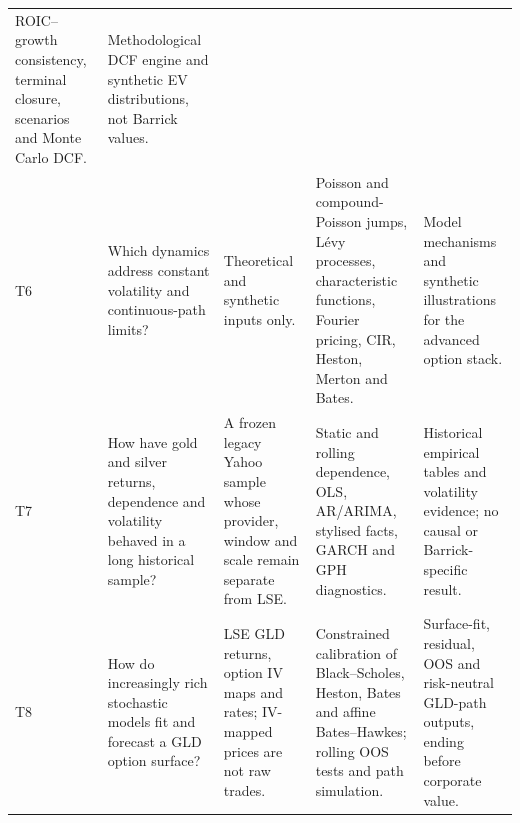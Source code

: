 \begin{table}[H]
\begin{tabularx}{\textwidth}{@{}p{0.85cm}p{2.32cm}X X X@{}}
ROIC--growth consistency, terminal closure, scenarios and Monte Carlo DCF. &
Methodological DCF engine and synthetic EV distributions, not Barrick values. \\
T6 & Which dynamics address constant volatility and continuous-path limits?
& Theoretical and synthetic inputs only. & Poisson and compound-Poisson jumps,
L\'evy processes, characteristic functions, Fourier pricing, CIR, Heston,
Merton and Bates. & Model mechanisms and synthetic illustrations for the
advanced option stack. \\
T7 & How have gold and silver returns, dependence and volatility behaved in a
long historical sample? & A frozen legacy Yahoo sample whose provider, window
and scale remain separate from LSE. & Static and rolling dependence, OLS,
AR/ARIMA, stylised facts, GARCH and GPH diagnostics. & Historical empirical
tables and volatility evidence; no causal or Barrick-specific result. \\
T8 & How do increasingly rich stochastic models fit and forecast a GLD option
surface? & LSE GLD returns, option IV maps and rates; IV-mapped prices are not
raw trades. & Constrained calibration of Black--Scholes, Heston, Bates and
affine Bates--Hawkes; rolling OOS tests and path simulation. & Surface-fit,
residual, OOS and risk-neutral GLD-path outputs, ending before corporate value. \\
\bottomrule
\end{tabularx}
\end{table}

